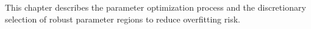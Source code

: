 This chapter describes the parameter optimization process and the discretionary selection of robust parameter regions to reduce overfitting risk.

